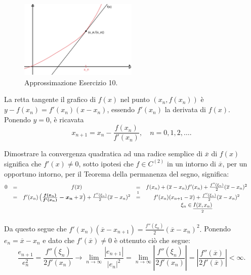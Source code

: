 \begin{figure}
	\centering
	\includegraphics[width=0.5\textwidth]{immagini/approxNewtEs10.jpg}
	\caption{Approssimazione Esercizio 10.}\label{fig:approxNewtEs10}
\end{figure}

\noindent La retta tangente il grafico di $f(x)$ nel punto $(x_n, f(x_n))$ è $y-f(x_n)=f'(x_n)(x-x_n)$, essendo $f'(x_n)$ la derivata di $f(x).$ Ponendo $y=0$, è ricavata
\begin{equation*}
	x_{n+1}=x_n-\frac{f(x_n)}{f'(x_n)},\quad n=0,1,2,\hdots.
\end{equation*}

\noindent Dimostrare la convergenza quadratica ad una radice semplice di $ \overline{x}$ di $f(x)$ significa che $f'(x)\neq 0$, sotto ipotesi che $f\in C^{(2)}$ in un intorno di $\overline{x}$, per un opportuno intorno, per il Teorema della permanenza del segno, significa:
\begin{equation*}
	\begin{matrix}
		0&=&f(\overline{x})&=& f(x_n)+(\overline{x}-x_n)f'(x_n)+\frac{f''(\xi_n)}{2}(\overline{x}-x_n)^2&&\\
		&=&f'(x_n)\left(\boldsymbol{\frac{f(x_n)}{f'(x_n)}-x_n}+\overline{x}\right) + \frac{f''(\xi_n)}{2}(\overline{x}-x_n)^2&\overset{\footnotemark}{=}& f'(x_n)(x_{n+1}-\overline{x})+\frac{f''(\xi_n)}{2}(\overline{x}-x_n)^2\\
		&&&&\xi_n\in\underset{\footnotemark}{\uline{I(\overline{x}, x_n)}}
	\end{matrix}
\end{equation*}

\addtocounter{footnote}{-1}


\noindent Da questo segue che $f'(x_n)(\overline{x}-x_{n+1})=\frac{f''(\xi_n)}{2}(\overline{x}-x_n)^2.$ Ponendo $e_n=\overline{x}-x_n$ e dato che $f'(\overline{x})\neq 0$ è ottenuto ciò che segue: 
\begin{equation*}
	\frac{e_{n+1}}{e_n^2}=\frac{f''(\xi_n)}{2f'(x_n)}\longrightarrow\lim_{n\rightarrow\infty}\frac{|e_{n+1}|}{|e_n|^2}=\lim_{n\rightarrow\infty}\left|\frac{f''(\xi_n)}{2f'(x_n)}\right|=\left|\frac{f''(\overline{x})}{2f'(\overline{x})}\right|<\infty.
\end{equation*}

